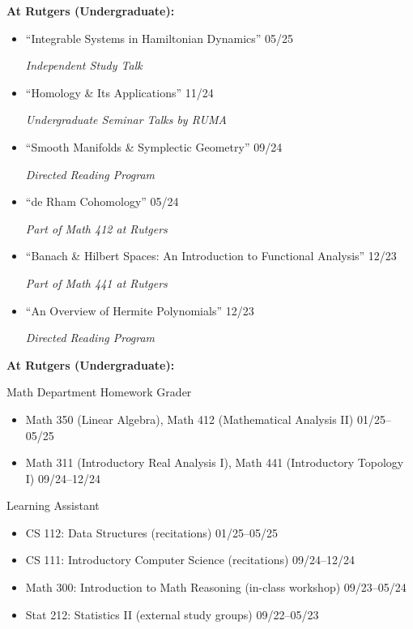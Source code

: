 \documentclass[11pt]{article}
\begin{document}
		\noindent \textbf{At Rutgers (Undergraduate):}
		\begin{itemize}
				\item ``Integrable Systems in Hamiltonian Dynamics'' \hfill 05/25 \par 
						\emph{Independent Study Talk} 

				\item ``Homology \& Its Applications'' \hfill 11/24 \par 
						\emph{Undergraduate Seminar Talks by RUMA}

				\item ``Smooth Manifolds \& Symplectic Geometry'' \hfill 09/24 \par 
						\emph{Directed Reading Program} 

				\item ``de Rham Cohomology'' \hfill 05/24 \par 
						\emph{Part of Math 412 at Rutgers} 

				\item ``Banach \& Hilbert Spaces: An Introduction to Functional Analysis'' \hfill 12/23 \par 
						\emph{Part of Math 441 at Rutgers} 

				\item ``An Overview of Hermite Polynomials'' \hfill 12/23 \par 
						\emph{Directed Reading Program}
		\end{itemize}
		\entryspace 

		\noindent \textbf{At Rutgers (Undergraduate):}\par
		\noindent Math Department Homework Grader
		\begin{itemize}
				\item Math 350 (Linear Algebra), Math 412 (Mathematical Analysis II) \hfill 01/25--05/25
				\item Math 311 (Introductory Real Analysis I), Math 441 (Introductory Topology I) \hfill 09/24--12/24
		\end{itemize}
		\noindent Learning Assistant
		\begin{itemize}
				\item CS 112: Data Structures (recitations) \hfill 01/25--05/25 
				\item CS 111: Introductory Computer Science (recitations) \hfill 09/24--12/24 
				\item Math 300: Introduction to Math Reasoning (in-class workshop) \hfill 09/23--05/24 
				\item Stat 212: Statistics II (external study groups) \hfill 09/22--05/23
		\end{itemize}
		\entryspace 
\end{document}
